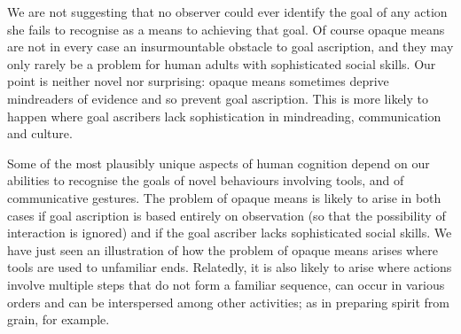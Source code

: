 \documentclass[12pt,a4paper]{extarticle}
\begin{document}
We are not suggesting that no observer could ever identify the goal of any action she fails to recognise as a means to achieving that goal.
Of course opaque means are not in every case an insurmountable obstacle to goal ascription, and
they may only rarely be a problem for human adults with sophisticated social skills.
Our point is neither novel nor surprising:
opaque means sometimes  deprive mindreaders of evidence and so prevent goal ascription.
This is more likely to happen where  goal ascribers lack sophistication in mindreading, communication and culture.

Some of the most plausibly unique aspects of human cognition depend on our abilities to recognise the goals of novel behaviours involving tools, and of communicative gestures.
The problem of opaque means is likely to arise in both cases
if goal ascription is based  entirely on observation 
(so that the possibility of interaction is ignored)
and if the goal ascriber lacks sophisticated social skills.
We have just seen an illustration of how the problem of opaque means arises where tools are used to unfamiliar ends.
Relatedly, it is also likely to arise where actions involve multiple steps that do not form a familiar sequence, can occur in various orders and can be interspersed among other activities;
as in preparing spirit from grain, for example.
\end{document}
